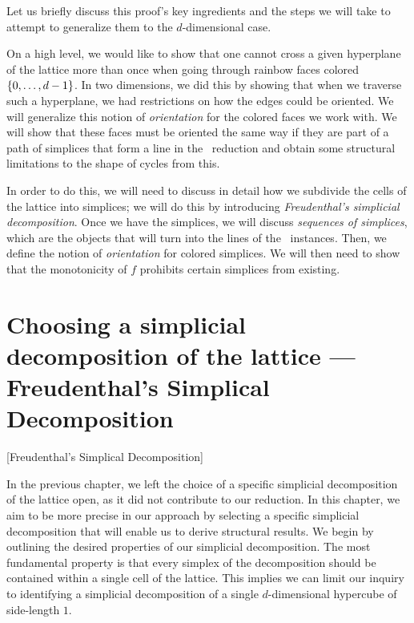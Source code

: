 Let us briefly discuss this proof's key ingredients and the steps we will take to attempt to generalize them to the $d$-dimensional case.

On a high level, we would like to show that one cannot cross a given hyperplane of the lattice more than once when going through rainbow faces colored $\left\{0, \dots, d-1\right\}$. In two dimensions, we did this by showing that when we traverse such a hyperplane, we had restrictions on how the edges could be oriented. We will generalize this notion of \emph{orientation} for the colored faces we work with.  We will show that these faces must be oriented the same way if they are part of a path of simplices that form a line in the \EndOfLine\ reduction and obtain some structural limitations to the shape of cycles from this.

In order to do this, we will need to discuss in detail how we subdivide the cells of the lattice into simplices; we will do this by introducing \emph{Freudenthal's simplicial decomposition}. Once we have the simplices, we will discuss \emph{sequences of simplices}, which are the objects that will turn into the lines of the \EndOfLine\ instances. Then, we define the notion of \emph{orientation} for colored simplices. We will then need to show that the monotonicity of $f$ prohibits certain simplices from existing.

\section{Choosing a simplicial decomposition of the lattice --- Freudenthal's Simplical Decomposition}[Freudenthal's Simplical Decomposition]\label{sec:freudenthal_simplicial_decomposition}

In the previous chapter, we left the choice of a specific simplicial decomposition of the lattice open, as it did not contribute to our reduction. In this chapter, we aim to be more precise in our approach by selecting a specific simplicial decomposition that will enable us to derive structural results. We begin by outlining the desired properties of our simplicial decomposition. The most fundamental property is that every simplex of the decomposition should be contained within a single cell of the lattice. This implies we can limit our inquiry to identifying a simplicial decomposition of a single $d$-dimensional hypercube of side-length $1$.


